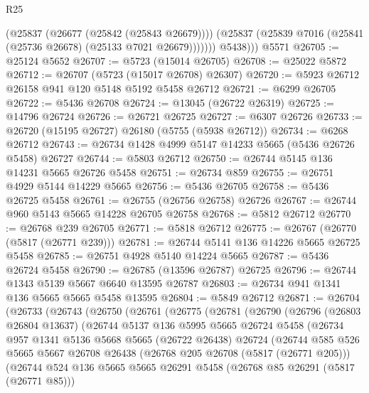 \begin{lexlean}{R25}
\begin{coremodule}
              (@25837 (@26677 (@25842 (@25843 @26679))))
              (@25837 (@25839 @7016 (@25841 (@25736 @26678) (@25133 @7021 @26679)))))))
          @5438)))
    @5571
@26705 := @25124 @5652
@26707 := @5723 (@15014 @26705)
@26708 := @25022 @5872
@26712 := @26707 (@5723 (@15017 @26708) @26307)
@26720 := @5923 @26712 @26158 @941 @120 @5148 @5192 @5458 @26712
@26721 := @6299 @26705
@26722 := @5436 @26708
@26724 := @13045 (@26722 @26319)
@26725 := @14796 @26724
@26726 := @26721 @26725
@26727 := @6307 @26726
@26733 := @26720 (@15195 @26727) @26180 (@5755 (@5938 @26712))
@26734 := @6268 @26712
@26743 := @26734 @1428 @4999 @5147 @14233 @5665 (@5436 @26726 @5458) @26727
@26744 := @5803 @26712
@26750 := @26744 @5145 @136 @14231 @5665 @26726 @5458
@26751 := @26734 @859
@26755 := @26751 @4929 @5144 @14229 @5665
@26756 := @5436 @26705
@26758 := @5436 @26725 @5458
@26761 := @26755 (@26756 @26758) @26726
@26767 := @26744 @960 @5143 @5665 @14228 @26705 @26758
@26768 := @5812 @26712
@26770 := @26768 @239 @26705
@26771 := @5818 @26712
@26775 := @26767 (@26770 (@5817 (@26771 @239)))
@26781 := @26744 @5141 @136 @14226 @5665 @26725 @5458
@26785 := @26751 @4928 @5140 @14224 @5665
@26787 := @5436 @26724 @5458
@26790 := @26785 (@13596 @26787) @26725
@26796 := @26744 @1343 @5139 @5667 @6640 @13595 @26787
@26803 := @26734 @941 @1341 @136 @5665 @5665 @5458 @13595
@26804 := @5849 @26712
@26871 := @26704
    (@26733
      (@26743
        (@26750
          (@26761
            (@26775
              (@26781
                (@26790
                  (@26796
                    (@26803 @26804 @13637)
                    (@26744
                      @5137
                      @136
                      @5995
                      @5665
                      @26724
                      @5458
                      (@26734
                        @957
                        @1341
                        @5136
                        @5668
                        @5665
                        (@26722 @26438)
                        @26724
                        (@26744
                          @585
                          @526
                          @5665
                          @5667
                          @26708
                          @26438
                          (@26768 @205 @26708 (@5817 (@26771 @205)))
                          (@26744
                            @524
                            @136
                            @5665
                            @5665
                            @26291
                            @5458
                            (@26768 @85 @26291 (@5817 (@26771 @85)))

\end{coremodule}
\end{lexlean}
